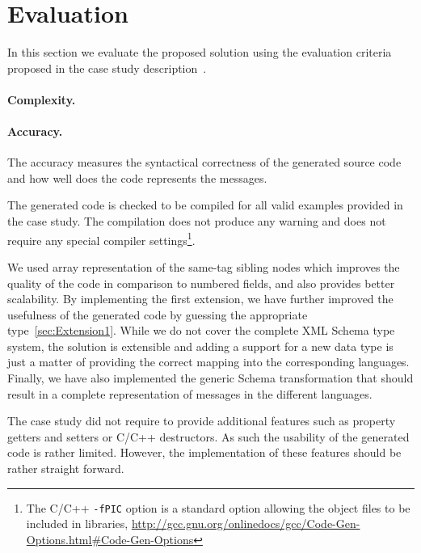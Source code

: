 
\section{Evaluation}
\label{sec:Evaluation}

In this section we evaluate the proposed solution using the evaluation criteria proposed in the case study description~\cite{Lano2014}.

\paragraph{Complexity.}


\paragraph{Accuracy.}
%
The accuracy measures the syntactical correctness of the generated source code and how well does the code represents the \FIXML messages.

The generated code is checked to be compiled for all valid examples provided in the case study.
The compilation does not produce any warning and does not require any special compiler settings\footnote{The C/C++ \texttt{-fPIC} option is a standard option allowing the object files to be included in libraries, \Cf \url{http://gcc.gnu.org/onlinedocs/gcc/Code-Gen-Options.html\#Code-Gen-Options}}.

We used array representation of the same-tag sibling nodes which improves the quality of the code in comparison to numbered fields, and also provides better scalability.
By implementing the first extension, we have further improved the usefulness of the generated code by guessing the appropriate type~\ref{sec:Extension1}.
While we do not cover the complete XML Schema type system, the solution is extensible and adding a support for a new data type is just a matter of providing the correct mapping into the corresponding languages.
Finally, we have also implemented the generic \FIXML Schema transformation that should result in a complete representation of \FIXML messages in the different languages.

The case study did not require to provide additional features such as property getters and setters or C/C++ destructors.
As such the usability of the generated code is rather limited.
However, the implementation of these features should be rather straight forward.

